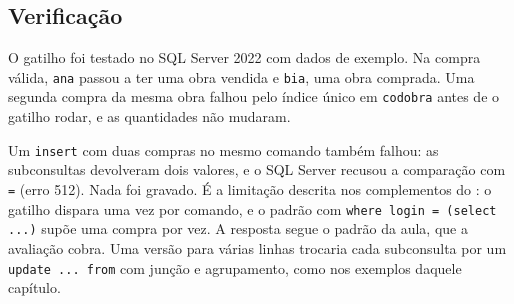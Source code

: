 \subsection{Verificação}

O gatilho foi testado no SQL Server 2022 com dados de exemplo. Na compra
válida, \texttt{ana} passou a ter uma obra vendida e \texttt{bia}, uma
obra comprada. Uma segunda compra da mesma obra falhou pelo índice único
em \texttt{codobra} antes de o gatilho rodar, e as quantidades não
mudaram.

Um \texttt{insert} com duas compras no mesmo comando também falhou: as
subconsultas devolveram dois valores, e o SQL Server recusou a
comparação com \texttt{=} (erro 512). Nada foi gravado. É a limitação
descrita nos complementos do : o gatilho dispara
uma vez por comando, e o padrão com \texttt{where login = (select ...)}
supõe uma compra por vez. A resposta segue o padrão da aula, que a
avaliação cobra. Uma versão para várias linhas trocaria cada
subconsulta por um \texttt{update ... from} com junção e agrupamento,
como nos exemplos daquele capítulo.
